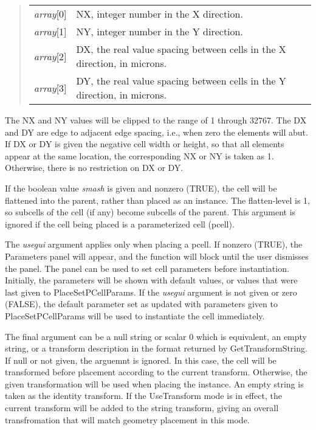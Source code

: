 \begin{description}
\begin{quote}
\begin{tabular}{ll}
{\it array\/}[0] & NX, integer number in the X direction.\\
{\it array\/}[1] & NY, integer number in the Y direction.\\
{\it array\/}[2] & DX, the real value spacing between cells in
  the X direction, in microns.\\
{\it array\/}[3] & DY, the real value spacing between cells in
  the Y direction, in microns.\\
\end{tabular}
\end{quote}

The NX and NY values will be clipped to the range of 1 through 32767. 
The DX and DY are edge to adjacent edge spacing, i.e., when zero the
elements will abut.  If DX or DY is given the negative cell width or
height, so that all elements appear at the same location, the
corresponding NX or NY is taken as 1.  Otherwise, there is no
restriction on DX or DY.

If the boolean value {\it smash} is given and nonzero (TRUE), the cell
will be flattened into the parent, rather than placed as an instance. 
The flatten-level is 1, so subcells of the cell (if any) become
subcells of the parent.  This argument is ignored if the cell being
placed is a parameterized cell (pcell).

The {\it usegui} argument applies only when placing a pcell.  If
nonzero (TRUE), the {\cb Parameters} panel will appear, and the
function will block until the user dismisses the panel.  The panel can
be used to set cell parameters before instantiation.  Initially, the
parameters will be shown with default values, or values that were last
given to {\vt PlaceSetPCellParams}.  If the {\it usegui} argument is
not given or zero (FALSE), the default parameter set as updated with
parameters given to {\vt PlaceSetPCellParams} will be used to
instantiate the cell immediately.

The final argument can be a null string or scalar 0 which is
equivalent, an empty string, or a transform description in the format
returned by {\vt GetTransformString}.  If null or not given, the
arguemnt is ignored.  In this case, the cell will be transformed
before placement according to the current transform.  Otherwise, the
given transformation will be used when placing the instance.  An empty
string is taken as the identity transform.  If the {\vt UseTransform}
mode is in effect, the current transform will be added to the string
transform, giving an overall transfromation that will match geometry
placement in this mode.


\end{description}
